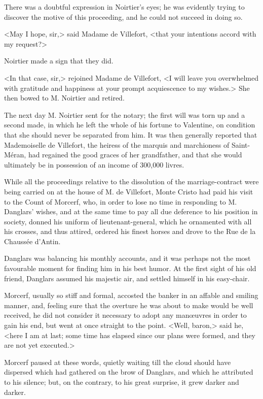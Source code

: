  There was a doubtful expression in Noirtier's eyes; he was evidently trying to discover the motive of this proceeding, and he could not succeed in doing so. 

 <May I hope, sir,> said Madame de Villefort, <that your intentions accord with my request?> 

 Noirtier made a sign that they did. 

 <In that case, sir,> rejoined Madame de Villefort, <I will leave you overwhelmed with gratitude and happiness at your prompt acquiescence to my wishes.> She then bowed to M. Noirtier and retired. 

 The next day M. Noirtier sent for the notary; the first will was torn up and a second made, in which he left the whole of his fortune to Valentine, on condition that she should never be separated from him. It was then generally reported that Mademoiselle de Villefort, the heiress of the marquis and marchioness of Saint-Méran, had regained the good graces of her grandfather, and that she would ultimately be in possession of an income of 300,000 livres. 

 While all the proceedings relative to the dissolution of the marriage-contract were being carried on at the house of M. de Villefort, Monte Cristo had paid his visit to the Count of Morcerf, who, in order to lose no time in responding to M. Danglars' wishes, and at the same time to pay all due deference to his position in society, donned his uniform of lieutenant-general, which he ornamented with all his crosses, and thus attired, ordered his finest horses and drove to the Rue de la Chaussée d'Antin. 

 Danglars was balancing his monthly accounts, and it was perhaps not the most favourable moment for finding him in his best humor. At the first sight of his old friend, Danglars assumed his majestic air, and settled himself in his easy-chair. 

 Morcerf, usually so stiff and formal, accosted the banker in an affable and smiling manner, and, feeling sure that the overture he was about to make would be well received, he did not consider it necessary to adopt any manœuvres in order to gain his end, but went at once straight to the point.  <Well, baron,> said he, <here I am at last; some time has elapsed since our plans were formed, and they are not yet executed.> 

 Morcerf paused at these words, quietly waiting till the cloud should have dispersed which had gathered on the brow of Danglars, and which he attributed to his silence; but, on the contrary, to his great surprise, it grew darker and darker. 


